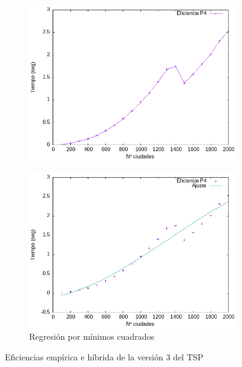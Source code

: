\documentclass{article}
\begin{document}
\begin{figure}[H]
    \centering
    \begin{subfigure}[b]{0.45\textwidth}
        \centering
        \includegraphics[width=\textwidth]{Problema4/imagenes/grafica_dani.png}
        \label{fig:tiempos_v3}
    \end{subfigure}
    \begin{subfigure}[b]{0.45\textwidth}
        \centering
        \includegraphics[width=\textwidth]{Problema4/imagenes/regresion_dani.png}
        \caption{Regresión por mínimos cuadrados}
        \label{fig:fit_v3}
    \end{subfigure}
    \caption{Eficiencias empírica e híbrida de la versión 3 del TSP}
\end{figure}
\end{document}
